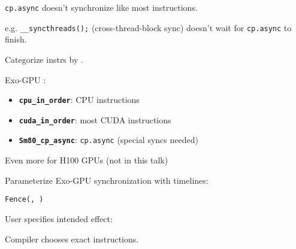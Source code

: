 \begin{center}
\Large
\begin{tikzpicture}[node distance=0mm]

\end{tikzpicture}
\end{center}


\newpage
{}

{\LARGE
\texttt{cp.async} doesn't synchronize like most instructions.

e.g. \texttt{\_\_syncthreads();} (cross-thread-block sync) doesn't wait for \texttt{cp.async} to finish.

}
\vfill

\begin{center}
\Large
\begin{tikzpicture}[node distance=0mm]

\end{tikzpicture}
\end{center}

\newpage
{}

{\LARGE
Categorize instrs by .

Exo-GPU :
\begin{itemize}
  \item \textbf{\texttt{cpu\_in\_order}}: CPU instructions
  \item \textbf{\texttt{cuda\_in\_order}}: most CUDA instructions
  \item \textbf{\texttt{Sm80\_cp\_async}}: \texttt{cp.async} (special syncs needed)
\end{itemize}

\vspace{9mm}
Even more for H100 GPUs (not in this talk)

}

\newpage
{}

{\LARGE
Parameterize Exo-GPU synchronization with timelines:

\begin{center}
  \texttt{Fence(, )}
\end{center}

User specifies intended effect:

\begin{center}
\end{center}

Compiler chooses exact instructions.


}

